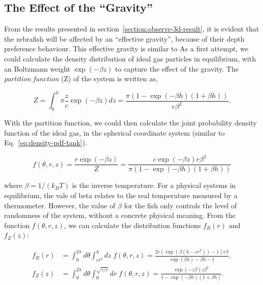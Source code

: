 \documentclass[11pt,twoside]{report}
\begin{document}
\subsection{The Effect of the ``Gravity''}
\label{section:sim-mc-gravity}

From the results presented in section~\ref{section:observe-3d-result}, it is evident that the zebrafish will be affected by an ``effective gravity'', because of their depth preference behaviour.
This effective gravity is similar to 
As a first attempt, we could calculate the density distribution of ideal gas particles in equilibrium, with an Boltzmann weight $\exp(-\beta z)$ to capture the effect of the gravity.
The \emph{partition function} (\gls{Z}) of the system is written as,

\begin{equation*}
	Z = \int_0^h \pi \frac{z}{c} \exp(-\beta z) dz
      = \frac{\pi (1 - \exp(-\beta h) (1 + \beta h))}{c \beta^2}.
\end{equation*}

\noindent With the partition function, we could then calculate the joint probability density function of the ideal gas, in the spherical coordinate system (similar to Eq.~\ref{eq:density-pdf-tank}).

\begin{equation}
	f(\theta, r, z)
	= \frac{r \exp(-\beta z)}{Z}
	= \frac{c \exp(-\beta z) r \beta^2}
	{\pi(1 - \exp(-\beta h)(1 + \beta h))}
\label{eq:density-pdf-gravity}
\end{equation}

\noindent where $\beta = 1 / (k_B T)$ is the inverse temperature. For a physical systems in equilibrium, the vale of \gls{beta} relates to the real temperature measured by a thermometer. However, the value of $\beta$ for the fish only controls the level of randomness of the system, without a concrete physical meaning. From the function $f(\theta, r, z)$, we can calculate the distribution functions $f_R(r)$ and $f_Z(z)$:

\begin{equation}
\begin{split}
	f_R(r) &= \int_0^{2\pi}{d \theta} \int_{cr^2}^{h}{dz} \; f(\theta, r, z)
		= \frac{
			2 c \left(
					\exp \left( \beta (h - c r^2) \right) - 1
				\right) r \beta
		}{
			\exp(\beta h) - \beta h - 1
		}, \\[2em]
	f_Z(z) &= \int_0^{2\pi}{d \theta} \int_0^{\sqrt{z/c}}{dr} \; f(\theta, r, z) 
	= \frac{\exp(-z \beta) z \beta^2}{
		1 - \exp(-\beta h) (1 + \beta h)
	}.
\end{split}
\label{eq:dist-gravity}
\end{equation}
\end{document}
